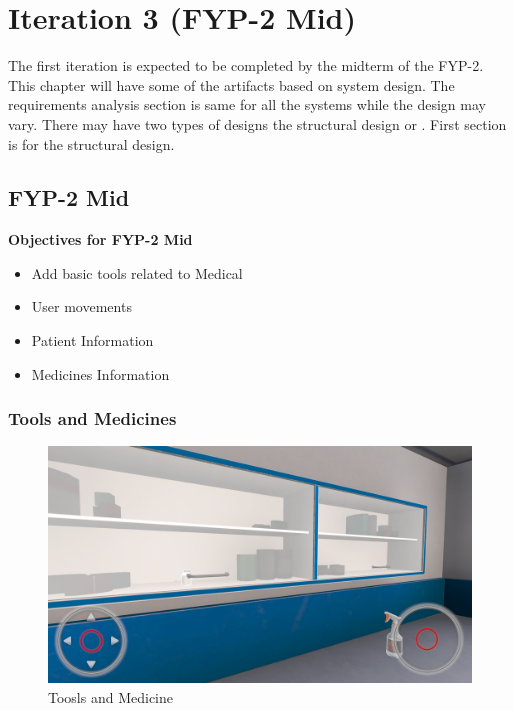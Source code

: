 \chapter{Iteration 3 (FYP-2 Mid)}
\label{ch:iter3}

The first iteration is expected to be completed by the midterm of the FYP-2.
This chapter will have some of the artifacts based on system design. The requirements analysis section is same for all the systems while the design may vary. There may have two types of designs the structural design or . First section is for the structural design.


\section{FYP-2 Mid}
\textbf{Objectives for FYP-2 Mid}
	\begin{itemize}
		\item Add basic tools related to Medical 
		\item User movements
		\item Patient Information
		\item Medicines Information 
	\end{itemize}
\newpage
\subsection{Tools and Medicines}
\begin{figure}[h]
	\centering
	\includegraphics[width=0.65\linewidth]{Images/Toosls and Medicine.png}
	\caption{Toosls and Medicine}
	\label{fig:system-diagram}
\end{figure}

